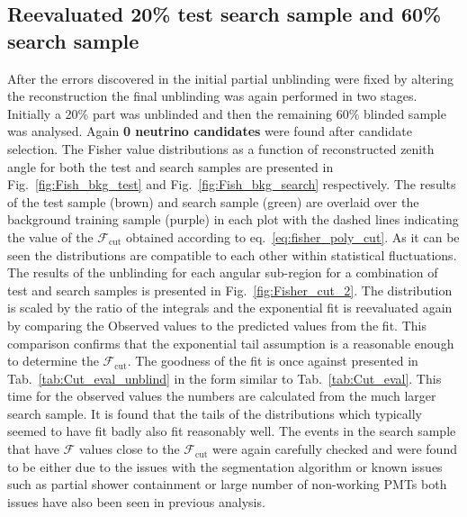 \subsection{Reevaluated 20\% test search sample and 60\% search sample}
\label{subsec:unblind_60}
After the errors discovered in the initial partial unblinding were fixed by altering the reconstruction the final unblinding was again performed in two stages. Initially a 20\% part was unblinded and then the remaining 60\% blinded sample was analysed. Again \textbf{0 neutrino candidates} were found after candidate selection. The Fisher value distributions as a function of reconstructed zenith angle for both the test and search samples are presented in Fig.~\ref{fig:Fish_bkg_test} and Fig.~\ref{fig:Fish_bkg_search} respectively. The results of the test sample (brown) and search sample (green) are overlaid over the background training sample (purple) in each plot with the dashed lines indicating the value of the $\mathcal{F}_{\text{cut}}$ obtained according to eq.~\ref{eq:fisher_poly_cut}. As it can be seen the distributions are compatible to each other within statistical fluctuations. The results of the unblinding for each angular sub-region for a combination of test and search samples is presented in Fig.~\ref{fig:Fisher_cut_2}. The distribution is scaled by the ratio of the integrals and the exponential fit is reevaluated again by comparing the Observed values to the predicted values from the fit. This comparison confirms that the exponential tail assumption is a reasonable enough to determine the $\mathcal{F}_{\text{cut}}$. The goodness of the fit is once against presented in Tab.~\ref{tab:Cut_eval_unblind} in the form similar to Tab.~\ref{tab:Cut_eval}. This time for the observed values the numbers are calculated from the much larger search sample. It is found that the tails of the distributions which typically seemed to have fit badly also fit reasonably well. The events in the search sample that have $\mathcal{F}$ values close to the $\mathcal{F}_{\text{cut}}$ were again carefully checked and were found to be either due to the issues with the segmentation algorithm or known issues such as partial shower containment or large number of non-working PMTs both issues have also been seen in previous analysis. 
\FloatBarrier

